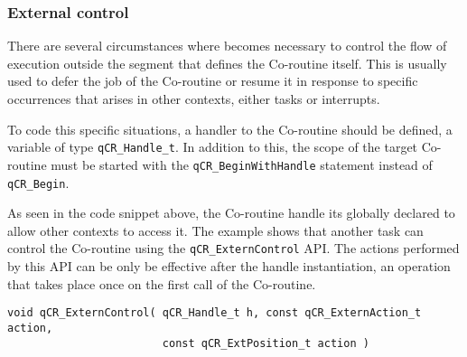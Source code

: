 \subsubsection{External control}
There are several circumstances where becomes necessary to control the flow of execution outside the segment that defines the Co-routine itself. This is usually used to defer the job of the Co-routine or resume it in response to specific occurrences that arises in other contexts, either tasks or interrupts.

To code this specific situations, a handler to the Co-routine should be defined, a variable of type \lstinline{qCR_Handle_t}. In addition to this, the scope of the target Co-routine must be started with the \lstinline{qCR_BeginWithHandle} statement instead of \lstinline{qCR_Begin}.
\medskip



As seen in the code snippet above, the Co-routine handle its globally declared to allow other contexts to access it.  The example shows that another task can control the Co-routine using the \lstinline{qCR_ExternControl} API. The actions performed by this API can be only be effective after the handle instantiation, an operation that takes place once on the first call of the Co-routine.
\medskip

\begin{lstlisting}[style=CStyle]
void qCR_ExternControl( qCR_Handle_t h, const qCR_ExternAction_t action,  
                        const qCR_ExtPosition_t action )                      
\end{lstlisting}

